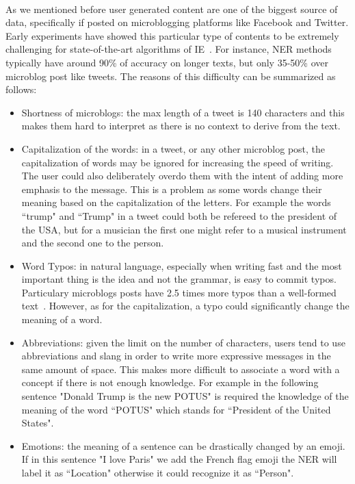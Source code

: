 \paragraph{}
As we mentioned before user generated content are one of the biggest source of data, specifically if posted on microblogging platforms like Facebook and Twitter. Early experiments have showed this particular type of contents to be extremely challenging for state-of-the-art algorithms of IE~\cite{derczynski2013microblog}. For instance, NER methods typically have around 90\% of accuracy on longer texts, but only 35-50\% over microblog post like tweets. The reasons of this difficulty can be summarized as follows:

\begin{itemize}[itemsep = 0.1em]
\item Shortness of microblogs: the max length of a tweet is 140 characters and this makes them hard to interpret as there is no context to derive from the text.

\item Capitalization of the words: in a tweet, or any other microblog post, the capitalization of words may be ignored for increasing the speed of writing. The user could also deliberately overdo them with the intent of adding more emphasis to the message. This is a problem as some words change their meaning based on the capitalization of the letters. For example the words ``trump" and ``Trump" in a tweet could both be refereed to the president of the USA, but for a musician the first one might refer to a musical instrument and the second one to the person.

\item Word Typos: in natural language, especially when writing fast and the most important thing is the idea and not the grammar, is easy to commit typos. Particulary microblogs posts have 2.5 times more typos than a well-formed text~\cite{derczynski2015analysis}. However, as for the capitalization, a typo could significantly change the meaning of a word.

\item Abbreviations: given the limit on the number of characters, users tend to use abbreviations and slang in order to write more expressive messages in the same amount of space. This makes more difficult to associate a word with a concept if there is not enough knowledge. For example in the following sentence "Donald Trump is the new POTUS" is required the knowledge of the meaning of the word ``POTUS" which stands for ``President of the United States".

\item Emotions: the meaning of a sentence can be drastically changed by an emoji. If in this sentence "I love Paris" we add the French flag emoji the NER will label it as ``Location" otherwise it could recognize it as ``Person".
\end{itemize}

